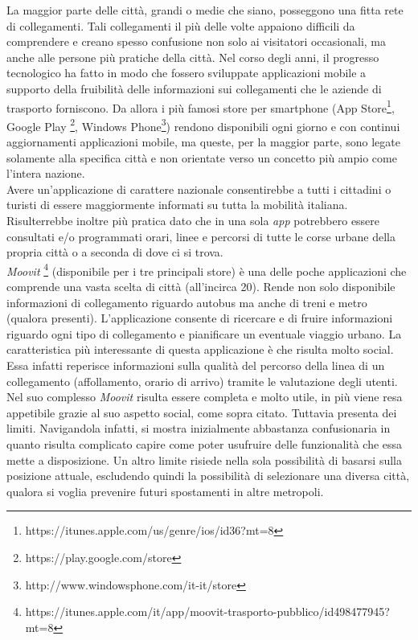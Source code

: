La maggior parte delle citt\`{a}, grandi o medie che siano, posseggono una fitta rete di collegamenti. Tali collegamenti il pi\`{u} delle volte appaiono difficili da comprendere e creano spesso confusione non solo ai visitatori occasionali, ma anche alle persone pi\`{u} pratiche della citt\`{a}. Nel corso degli anni, il progresso tecnologico ha fatto in modo che fossero sviluppate applicazioni mobile a supporto della fruibilit\`{a} delle informazioni sui collegamenti che le aziende di trasporto forniscono. 
Da allora i pi\`{u} famosi store per smartphone (App Store\footnote{https://itunes.apple.com/us/genre/ios/id36?mt=8}, Google Play \footnote{https://play.google.com/store}, Windows Phone\footnote{http://www.windowsphone.com/it-it/store}) rendono disponibili ogni giorno e con continui aggiornamenti applicazioni mobile, ma queste, per la maggior parte, sono legate solamente alla specifica citt\`{a} e non orientate verso un concetto pi\`{u} ampio come l\rq intera nazione.\\ 
Avere un\rq applicazione di carattere nazionale consentirebbe a tutti i cittadini o turisti di essere maggiormente informati su tutta la mobilit\`{a} italiana. Risulterrebbe inoltre pi\`{u} pratica dato che in una sola \emph{app} potrebbero essere consultati e/o programmati orari, linee e percorsi di tutte le corse urbane della propria citt\`{a} o a seconda di dove ci si trova.\\
\emph{Moovit} \footnote{https://itunes.apple.com/it/app/moovit-trasporto-pubblico/id498477945?mt=8} (disponibile per i tre principali store) \`{e} una delle poche applicazioni che comprende una vasta scelta di citt\`{a} (all\rq incirca 20). Rende non solo disponibile informazioni di collegamento riguardo autobus ma anche di treni e metro (qualora presenti). L\rq applicazione consente di ricercare e di fruire informazioni riguardo ogni tipo di collegamento e pianificare un eventuale viaggio urbano. 
La caratteristica pi\`{u} interessante di questa applicazione \`{e} che risulta molto social. Essa infatti reperisce informazioni sulla qualit\`{a} del percorso della linea di un collegamento (affollamento, orario di arrivo) tramite le valutazione degli utenti. 
Nel suo complesso \emph{Moovit} risulta essere completa e molto utile, in pi\`{u} viene resa appetibile grazie al suo aspetto social, come sopra citato. Tuttavia presenta dei limiti. Navigandola infatti, si mostra inizialmente abbastanza confusionaria in quanto risulta complicato capire come poter usufruire delle funzionalit\`{a} che essa mette a disposizione. Un altro limite risiede nella sola possibilit\`{a} di basarsi sulla posizione attuale, escludendo quindi la possibilit\`{a} di selezionare una diversa citt\`{a}, qualora si voglia prevenire futuri spostamenti in altre metropoli.
